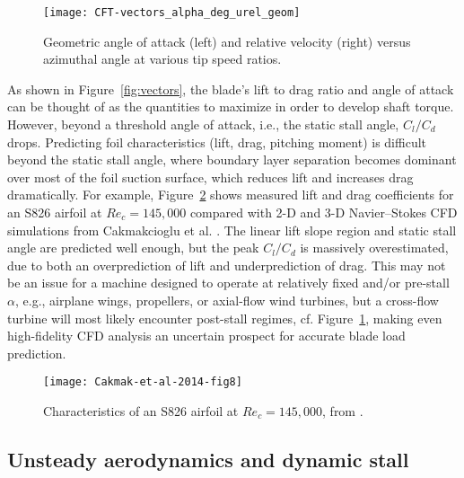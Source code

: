 \begin{figure}
    \centering
    
    \texttt{[image: CFT-vectors\_alpha\_deg\_urel\_geom]}
    
    \caption{Geometric angle of attack (left) and relative velocity (right)
        versus azimuthal angle at various tip speed ratios.}
    
    \label{fig:geom-alpha-urel}
\end{figure}

As shown in Figure~\ref{fig:vectors}, the blade's lift to drag ratio and angle
of attack can be thought of as the quantities to maximize in order to develop
shaft torque. However, beyond a threshold angle of attack, i.e., the static
stall angle, $C_l/C_d$ drops. Predicting foil characteristics (lift, drag,
pitching moment) is difficult beyond the static stall angle, where boundary
layer separation becomes dominant over most of the foil suction surface, which
reduces lift and increases drag dramatically. For example,
Figure~\ref{fig:S826-perf} shows measured lift and drag coefficients for an S826
airfoil at $Re_c=145,000$ compared with 2-D and 3-D Navier--Stokes CFD
simulations from Cakmakcioglu et al. \cite{Cakmakcioglu2014}. The linear lift
slope region and static stall angle are predicted well enough, but the peak
$C_l/C_d$ is massively overestimated, due to both an overprediction of lift and
underprediction of drag. This may not be an issue for a machine designed to
operate at relatively fixed and/or pre-stall $\alpha$, e.g., airplane wings,
propellers, or axial-flow wind turbines, but a cross-flow turbine will most
likely encounter post-stall regimes, cf. Figure~\ref{fig:geom-alpha-urel},
making even high-fidelity CFD analysis an uncertain prospect for accurate blade
load prediction.

\begin{figure}
    \centering
    
    \texttt{[image: Cakmak-et-al-2014-fig8]}
    
    \caption{Characteristics of an S826 airfoil at $Re_c=145,000$, from
        \cite{Cakmakcioglu2014}.}
    
    \label{fig:S826-perf}
\end{figure}


\subsection{Unsteady aerodynamics and dynamic stall}

